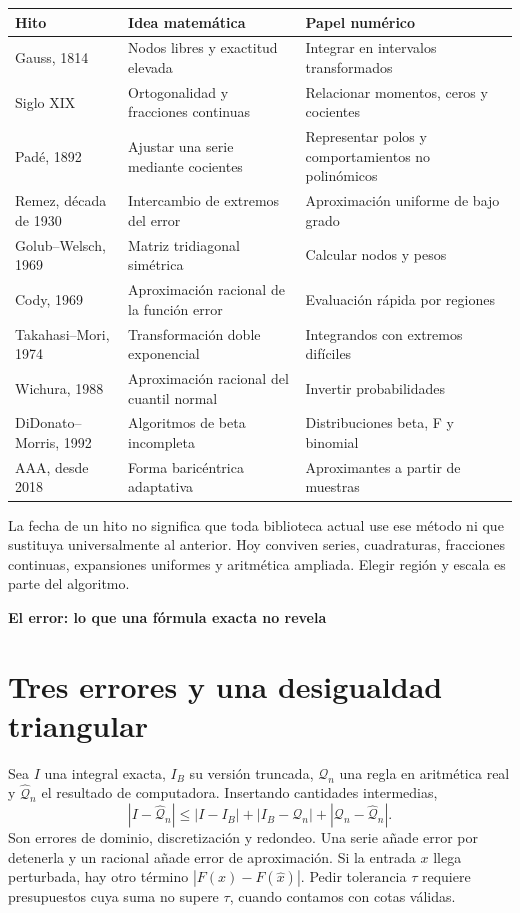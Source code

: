 \documentclass[11pt,a4paper]{article}
\theoremstyle{definition}
\newcommand{\parte}[1]{\par\bigskip\Needspace{8\baselineskip}\begin{center}{\Large\bfseries\color{azul}#1}\end{center}}
\begin{document}
\begin{center}\small
\begin{tabular}{>{\raggedright\arraybackslash}p{2cm}>{\raggedright\arraybackslash}p{5.3cm}>{\raggedright\arraybackslash}p{7.3cm}}
\toprule Hito & Idea matemática & Papel numérico\\\midrule
Gauss, 1814 & Nodos libres y exactitud elevada & Integrar en intervalos transformados\\
Siglo XIX & Ortogonalidad y fracciones continuas & Relacionar momentos, ceros y cocientes\\
Padé, 1892 & Ajustar una serie mediante cocientes & Representar polos y comportamientos no polinómicos\\
Remez, década de 1930 & Intercambio de extremos del error & Aproximación uniforme de bajo grado\\
Golub--Welsch, 1969 & Matriz tridiagonal simétrica & Calcular nodos y pesos\\
Cody, 1969 & Aproximación racional de la función error & Evaluación rápida por regiones\\
Takahasi--Mori, 1974 & Transformación doble exponencial & Integrandos con extremos difíciles\\
Wichura, 1988 & Aproximación racional del cuantil normal & Invertir probabilidades\\
DiDonato--Morris, 1992 & Algoritmos de beta incompleta & Distribuciones beta, F y binomial\\
AAA, desde 2018 & Forma baricéntrica adaptativa & Aproximantes a partir de muestras\\
\bottomrule
\end{tabular}
\end{center}
La fecha de un hito no significa que toda biblioteca actual use ese método ni que sustituya universalmente al anterior. Hoy conviven series, cuadraturas, fracciones continuas, expansiones uniformes y aritmética ampliada. Elegir región y escala es parte del algoritmo.


\parte{El error: lo que una fórmula exacta no revela}
\section{Tres errores y una desigualdad triangular}
Sea $I$ una integral exacta, $I_B$ su versión truncada, $\mathcal Q_n$ una regla en aritmética real y $\widehat{\mathcal Q}_n$ el resultado de computadora. Insertando cantidades intermedias,
\[
|I-\widehat{\mathcal Q}_n|
\le |I-I_B|+|I_B-\mathcal Q_n|+|\mathcal Q_n-\widehat{\mathcal Q}_n|.
\]
Son errores de dominio, discretización y redondeo. Una serie añade error por detenerla y un racional añade error de aproximación. Si la entrada $x$ llega perturbada, hay otro término $|F(x)-F(\widehat x)|$. Pedir tolerancia $\tau$ requiere presupuestos cuya suma no supere $\tau$, cuando contamos con cotas válidas.
\end{document}
